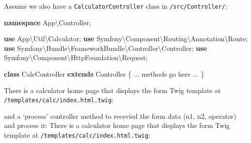 \documentclass[a4paperpaper,openright]{book}
\newenvironment{Shaded}{}{}
\newcommand{\AnnotationTok}[1]{\textcolor[rgb]{0.38,0.63,0.69}{\textbf{\textit{#1}}}}
\newcommand{\CommentTok}[1]{\textcolor[rgb]{0.38,0.63,0.69}{\textit{#1}}}
\newcommand{\KeywordTok}[1]{\textcolor[rgb]{0.00,0.44,0.13}{\textbf{#1}}}
\newcommand{\NormalTok}[1]{#1}
\newcommand{\OtherTok}[1]{\textcolor[rgb]{0.00,0.44,0.13}{#1}}
\newcommand{\StringTok}[1]{\textcolor[rgb]{0.25,0.44,0.63}{#1}}
\begin{document}
Assume we also have a \texttt{CalculatorController} class in
\texttt{/src/Controller/}:

\begin{Shaded}
\begin{Highlighting}[]
    \KeywordTok{namespace}\NormalTok{ App\textbackslash{}Controller}\OtherTok{;}

    \KeywordTok{use}\NormalTok{ App\textbackslash{}Util\textbackslash{}Calculator}\OtherTok{;}
    \KeywordTok{use}\NormalTok{ Symfony\textbackslash{}Component\textbackslash{}Routing\textbackslash{}Annotation\textbackslash{}Route}\OtherTok{;}
    \KeywordTok{use}\NormalTok{ Symfony\textbackslash{}Bundle\textbackslash{}FrameworkBundle\textbackslash{}Controller\textbackslash{}Controller}\OtherTok{;}
    \KeywordTok{use}\NormalTok{ Symfony\textbackslash{}Component\textbackslash{}HttpFoundation\textbackslash{}Request}\OtherTok{;}

    \KeywordTok{class}\NormalTok{ CalcController }\KeywordTok{extends}\NormalTok{ Controller}
\NormalTok{    \{}
        \StringTok{...}\NormalTok{ methods go here }\StringTok{...}
\NormalTok{    \}}
\end{Highlighting}
\end{Shaded}

There is a calculator home page that displays the form Twig template at
\texttt{/templates/calc/index.html.twig}:

\begin{Shaded}
\end{Shaded}

and a `process' controller method to recevied the form data (n1, n2,
operator) and process it: There is a calculator home page that displays
the form Twig template at \texttt{/templates/calc/index.html.twig}:
\end{document}
